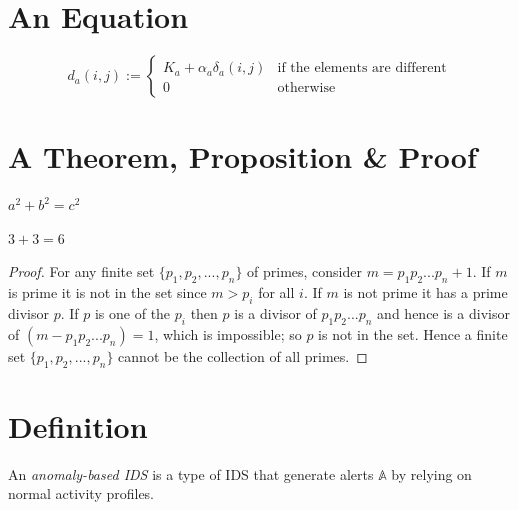 
\section{An Equation}

\begin{equation}
d_a(i,j) := \left\{
\begin{array}{lll}
K_a + \alpha_{a} \delta_{a}(i,j) & \mbox{if the elements are different} \\
0 & \mbox{otherwise}
\end{array}
\right.
\label{eq:distfunction}
\end{equation}


\section{A Theorem, Proposition \& Proof}

\begin{thm}
$a^2 + b^2 = c^2$
\end{thm}

\begin{prop}
$3 + 3 = 6$
\end{prop}

\begin{proof}
For any finite set $\{p_1,p_2,...,p_n\}$ of primes, consider $m = p_1p_2...p_n+1$. If $m$ is prime it is not in the set since $m > p_i$ for all $i$. If $m$ is not prime it has a prime divisor $p$. If $p$ is one of the $p_i$ then $p$ is a divisor of $p_1p_2...p_n$ and hence is a divisor of $(m - p_1p_2...p_n) = 1$, which is impossible; so $p$ is not in the set. Hence a finite set $\{p_1,p_2,...,p_n\}$ cannot be the collection of all primes.
\end{proof}


\section{Definition}

\begin{definition}
An \emph{anomaly-based \ac{IDS}} is a type of \ac{IDS} that generate alerts $\mathbb{A}$ by relying on normal activity profiles.
\end{definition}


